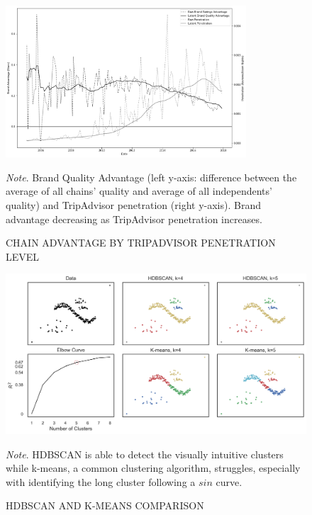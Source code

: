 \documentclass[mksc,blindrev]{informs3} %
\begin{document}
\begin{figure}[hp]
\caption{CHAIN ADVANTAGE BY TRIPADVISOR PENETRATION LEVEL}
 \label{fig:modelfree}
 \centering
 \includegraphics[width=0.8\textwidth,height=\textheight,keepaspectratio]{./Figures/OTA_Brand_v_Chain_v_PenetrationV2.png}
 \begin{flushleft}
\small
\textit{Note}. Brand Quality Advantage (left y-axis: difference between the average of all chains' quality and average of all independents' quality) and TripAdvisor penetration (right y-axis). Brand advantage decreasing as TripAdvisor penetration increases.
\end{flushleft}
\end{figure}
\clearpage

\begin{figure}[hp]
\caption{HDBSCAN AND K-MEANS COMPARISON}
 \centering  
{\includegraphics[width=\textwidth,height=\textheight,keepaspectratio]{./Figures/clusters.png} 
\label{fig:cluster}}
\\ 
\begin{flushleft}
\small
\textit{Note}. HDBSCAN is able to detect the visually intuitive clusters while k-means, a common clustering algorithm, struggles, especially with identifying the long cluster following a $sin$ curve.
\end{flushleft}
\end{figure}
\end{document}
